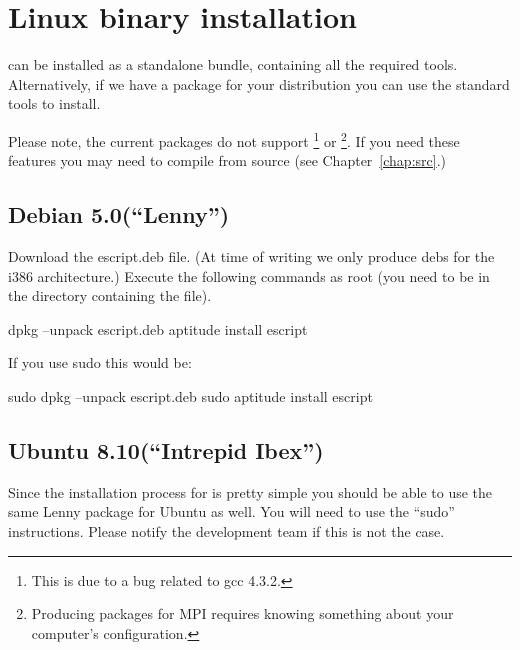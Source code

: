 
%
%
%

\section{Linux binary installation}
\label{sec:binlinux}

\esfinley can be installed as a standalone bundle, containing all the required tools.
Alternatively, if we have a package for your distribution you can use the standard tools to install.

Please note, the current packages do not support \openmp\footnote{This is due to a bug related to gcc 4.3.2.} or \mpi\footnote{Producing packages for MPI requires knowing something about your computer's configuration.}.
If you need these features you may need to compile \esfinley from source (see Chapter~\ref{chap:src}.)


\subsection{Debian 5.0(``Lenny'')}

Download the escript.deb file.
(At time of writing we only produce debs for the i386 architecture.)
Execute the following commands as root (you need to be in the directory containing the file).
\begin{shellCode}
 dpkg --unpack escript.deb
 aptitude install escript
\end{shellCode}

If you use sudo this would be:
\begin{shellCode}
sudo dpkg --unpack escript.deb
sudo aptitude install escript
\end{shellCode}

\subsection{Ubuntu 8.10(``Intrepid Ibex'')}

Since the installation process for \esfinley is pretty simple you should be able to use the same Lenny package for Ubuntu as well.
You will need to use the ``sudo'' instructions.
Please notify the development team if this is not the case.



